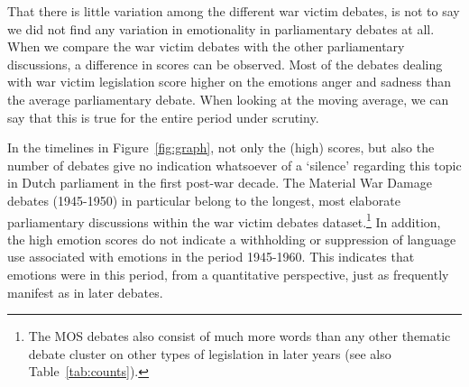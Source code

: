 \documentclass{dhbenelux}
\begin{document}

That there is little variation among the different war victim debates, is not to say we did not find any variation in emotionality in parliamentary debates at all. When we compare the war victim debates with the other parliamentary discussions, a difference in scores can be observed. Most of the debates dealing with war victim legislation score higher on the emotions anger and sadness than the average parliamentary debate. When looking at the moving average, we can say that this is true for the entire period under scrutiny.

In the timelines in 
Figure~\ref{fig:graph}, 
not only the (high) scores, but also the number of debates give no indication whatsoever of a ‘silence’ regarding this topic in Dutch parliament in the first post-war decade. The Material War Damage debates (1945-1950) in particular belong to the longest, most elaborate parliamentary discussions within the war victim debates dataset.\footnote{The MOS debates also consist of much more words than any other thematic debate cluster on other types of legislation in later years (see also Table~\ref{tab:counts}).} In addition, the high emotion scores do not indicate a withholding or suppression of language use associated with emotions in the period 1945-1960. This indicates that emotions were in this period, from a quantitative perspective, just as frequently manifest as in later debates.
\end{document}
